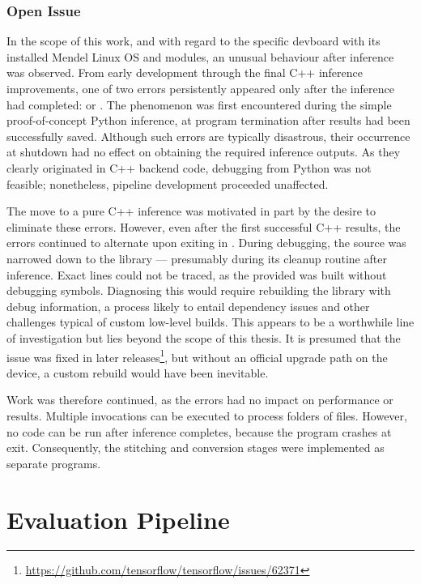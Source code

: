 {\subsubsection*{Open Issue}

In the scope of this work, and with regard to the specific \gls{devboard} with its installed Mendel Linux OS and modules, an unusual behaviour after inference was observed.
From early development through the final C++ inference improvements, one of two errors persistently appeared only after the inference had completed:
 or .
The phenomenon was first encountered during the simple proof-of-concept Python inference, at program termination after results had been successfully saved.
Although such errors are typically disastrous, their occurrence at shutdown had no effect on obtaining the required inference outputs.
As they clearly originated in C++ backend code, debugging from Python was not feasible; nonetheless, pipeline development proceeded unaffected.

The move to a pure C++ inference was motivated in part by the desire to eliminate these errors.
However, even after the first successful C++ results, the errors continued to alternate upon exiting  in .
During debugging, the source was narrowed down to the  library --- presumably during its cleanup routine after inference.
Exact lines could not be traced, as the provided  was built without debugging symbols.
Diagnosing this would require rebuilding the library with debug information, a process likely to entail dependency issues and other challenges typical of custom low-level builds.
This appears to be a worthwhile line of investigation but lies beyond the scope of this thesis.
It is presumed that the issue was fixed in later  releases\footnote{\url{https://github.com/tensorflow/tensorflow/issues/62371}},
but without an official upgrade path on the device, a custom rebuild would have been inevitable.

Work was therefore continued, as the errors had no impact on performance or results.
Multiple  invocations can be executed to process folders of files. However, no code can be run after inference completes, because the program crashes at exit.
Consequently, the stitching and conversion stages were implemented as separate programs.

\section{Evaluation Pipeline}
\label{sec:evaluation}

}
